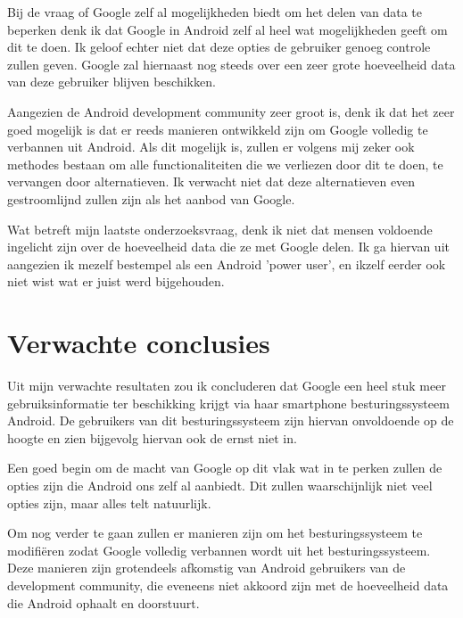 \vspace{2mm}

Bij de vraag of Google zelf al mogelijkheden biedt om het delen van data te beperken denk ik dat Google in Android zelf al heel wat mogelijkheden geeft om dit te doen. Ik geloof echter niet dat deze opties de gebruiker genoeg controle zullen geven. Google zal hiernaast nog steeds over een zeer grote hoeveelheid data van deze gebruiker blijven beschikken.

\vspace{2mm}

Aangezien de Android development community zeer groot is, denk ik dat het zeer goed mogelijk is dat er reeds manieren ontwikkeld zijn om Google volledig te verbannen uit Android. Als dit mogelijk is, zullen er volgens mij zeker ook methodes bestaan om alle functionaliteiten die we verliezen door dit te doen, te vervangen door alternatieven. Ik verwacht niet dat deze alternatieven even gestroomlijnd zullen zijn als het aanbod van Google. 

\vspace{2mm}

Wat betreft mijn laatste onderzoeksvraag, denk ik niet dat mensen voldoende ingelicht zijn over de hoeveelheid data die ze met Google delen. Ik ga hiervan uit aangezien ik mezelf bestempel als een Android 'power user', en ikzelf eerder ook niet wist wat er juist werd bijgehouden.


\section{Verwachte conclusies}
\label{sec:verwachte_conclusies}


Uit mijn verwachte resultaten zou ik concluderen dat Google een heel stuk meer gebruiksinformatie ter beschikking krijgt via haar smartphone besturingssysteem Android. De gebruikers van dit besturingssysteem zijn hiervan onvoldoende op de hoogte en zien bijgevolg hiervan ook de ernst niet in.

Een goed begin om de macht van Google op dit vlak wat in te perken zullen de opties zijn die Android ons zelf al aanbiedt. Dit zullen waarschijnlijk niet veel opties zijn, maar alles telt natuurlijk. 

Om nog verder te gaan zullen er manieren zijn om het besturingssysteem te modifiëren zodat Google volledig verbannen wordt uit het besturingssysteem. Deze manieren zijn grotendeels afkomstig van Android gebruikers van de development community, die eveneens niet akkoord zijn met de hoeveelheid data die Android ophaalt en doorstuurt.


